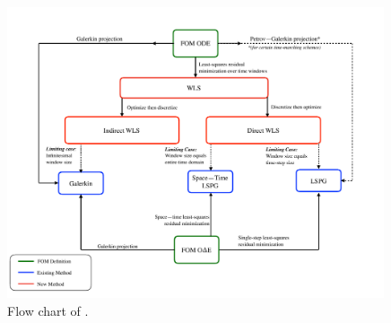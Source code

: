 \documentclass[3p,computermodern,10pt]{elsarticle}
\begin{document}

\begin{figure} 
\begin{centering} 
\includegraphics[trim={0.1cm 0cm 1cm 0cm},clip,width=0.99\textwidth]{diagram.pdf} 
\caption{Flow chart of \methodAcronym.} 
\label{fig:flowchart} 
\end{centering} 
\end{figure}
\end{document}
